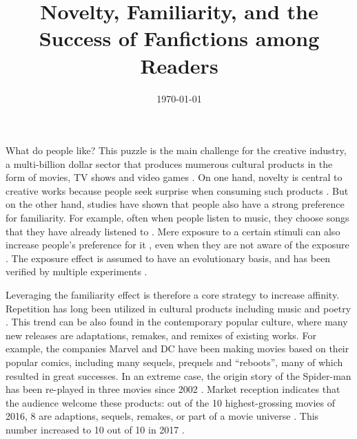 \documentclass[a4paper]{article}
\begin{document}

\title{Novelty, Familiarity, and the Success of Fanfictions among Readers} %
\date{\today}
\maketitle %

\begin{abstract}

\end{abstract}

What do people like? This puzzle is the main challenge for the creative industry, a multi-billion dollar sector that produces mumerous cultural products in the form of movies, TV shows and video games \cite{creativeindustries}. On one hand, novelty is central to creative works because people seek surprise when consuming such products \cite{hutter2011infinite}. But on the other hand, studies have shown that people also have a strong preference for familiarity. For example, often when people listen to music, they choose songs that they have already listened to \cite{thompson2014shazam}. Mere exposure to a certain stimuli can also increase people's preference for it \cite{zajonc1968attitudinal}, even when they are not aware of the exposure \cite{kunst1980affective}. The exposure effect is assumed to have an evolutionary basis, and has been verified by multiple experiments \cite{bornstein1989exposure}.

Leveraging the familiarity effect is therefore a core strategy to increase affinity. Repetition has long been utilized in cultural products including music and poetry \cite{huron2013psychological}. This trend can be also found in the contemporary popular culture, where many new releases are adaptations, remakes, and remixes \cite{manovich2007comes} of existing works. For example, the companies Marvel and DC have been making movies based on their popular comics, including many sequels, prequels and ``reboots'', many of which resulted in great successes. In an extreme case, the origin story of the Spider-man has been re-played in three movies since 2002 \cite{spiderman}. Market reception indicates that the audience welcome these products: out of the 10 highest-grossing movies of 2016, 8 are adaptions, sequels, remakes, or part of a movie universe \cite{2016film}. This number increased to 10 out of 10 in 2017 \cite{2017film}. 
\end{document}
